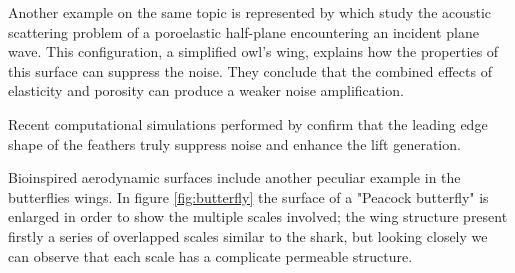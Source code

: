 Another example on the same topic is represented by \citet{jaworski2013aerodynamic} which study the acoustic scattering problem of a poroelastic half-plane encountering an incident plane wave.
This configuration, a simplified owl's wing, explains how the properties of this surface can suppress the noise.
They conclude that the combined effects of elasticity and porosity can produce a weaker noise amplification.

Recent computational simulations performed by \citet{rao2017owl} confirm that the leading edge shape of the feathers truly suppress noise and enhance the lift generation.

Bioinspired aerodynamic surfaces include another peculiar example in the butterflies wings.
In figure \ref{fig:butterfly} the surface of a "Peacock butterfly" is enlarged in order to show the multiple scales involved; the wing structure present firstly a series of overlapped scales similar to the shark, but looking closely we can observe that each scale has a complicate permeable structure.

